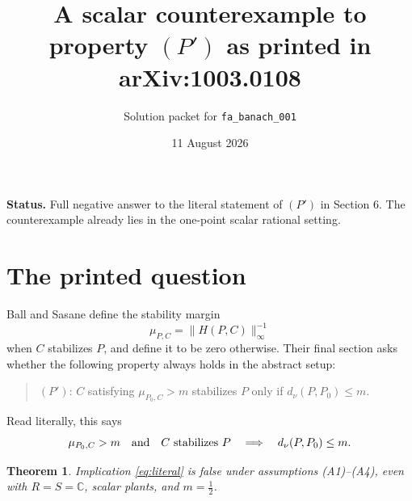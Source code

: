 \documentclass[11pt]{article}
\title{A scalar counterexample to property $(P')$ as printed in arXiv:1003.0108}
\author{Solution packet for \texttt{fa\_banach\_001}}
\date{11 August 2026}
\newtheorem{theorem}{Theorem}
\begin{document}
\maketitle

\noindent\textbf{Status.}
Full negative answer to the literal statement of $(P')$ in Section 6.
The counterexample already lies in the one-point scalar rational setting.

\section*{The printed question}

Ball and Sasane define the stability margin
\[
 \mu_{P,C}=\|H(P,C)\|_\infty^{-1}
\]
when $C$ stabilizes $P$, and define it to be zero otherwise.  Their final
section asks whether the following property always holds in the abstract
setup:
\begin{quote}
$(P')$: $C$ satisfying $\mu_{P_0,C}>m$ stabilizes $P$ only if
$d_\nu(P,P_0)\le m$.
\end{quote}
Read literally, this says
\begin{equation}\label{eq:literal}
 \mu_{P_0,C}>m\quad\hbox{and}\quad C\text{ stabilizes }P
 \quad\Longrightarrow\quad d_\nu(P,P_0)\le m.
\end{equation}

\begin{theorem}
Implication \eqref{eq:literal} is false under assumptions (A1)--(A4), even
with $R=S=\mathbb C$, scalar plants, and $m=\frac12$.
\end{theorem}
\end{document}
